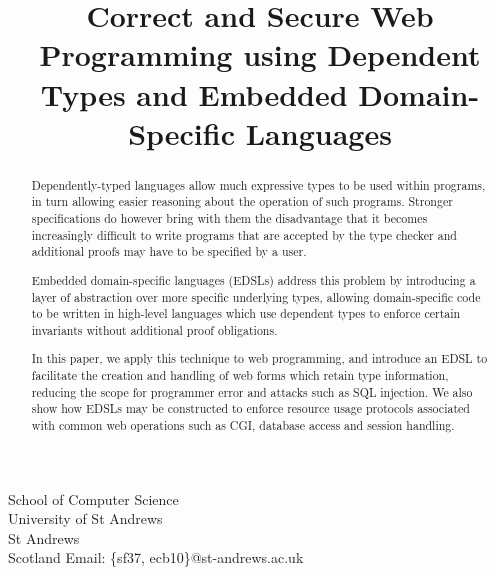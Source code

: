 \documentclass[preprint]{sigplanconf}
\begin{document}
\newcommand{\idris}{\textsc{Idris}}
\newcommand{\idata}{\textsf{iData}}
\newcommand{\itasks}{\textsf{iTasks}}
\setlength{\pdfpageheight}{\paperheight}
\setlength{\pdfpagewidth}{\paperwidth}





\titlebanner{}        %
\preprintfooter{}   %

\title{Correct and Secure Web Programming using Dependent Types and Embedded Domain-Specific Languages}

           {School of Computer Science \\ University of St Andrews \\ St Andrews \\ Scotland}
           {Email: \{sf37, ecb10\}@st-andrews.ac.uk}

\maketitle

\begin{abstract}
Dependently-typed languages allow much expressive types to be used within programs, in turn allowing easier reasoning about the operation of such programs. Stronger specifications do however bring with them the disadvantage that it becomes increasingly difficult to write programs that are accepted by the type checker and additional proofs may have to be specified by a user.

Embedded domain-specific languages (EDSLs) address this problem by introducing a layer of abstraction over more specific underlying types, allowing domain-specific code to be written in high-level languages which use dependent types to enforce certain invariants without additional proof obligations. 

In this paper, we apply this technique to web programming, and introduce an EDSL to facilitate the creation and handling of web forms which retain type information, reducing the scope for programmer error and attacks such as SQL injection. We also show how EDSLs may be constructed to enforce resource usage protocols associated with common web operations such as CGI, database access and session handling. 
\end{abstract}
\end{document}
